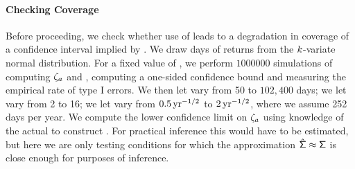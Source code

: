 \documentclass[10pt,a4paper,english]{article}
\theoremstyle{plain}
\theoremstyle{definition}
\newtheorem{example}{Example}[section]
\theoremstyle{remark}
\providecommand{\cono}[1][\typeI]{\mathSUB{c}{#1}}
\begin{document}
\paragraph{Checking Coverage}


Before proceeding, we check whether use of 
leads to a degradation in coverage of a confidence interval implied by .
We draw \ssiz days of returns from the $\nstrat$-variate normal distribution.
For a fixed value of \psnropt, we perform 
$1000000$ simulations of computing $\psnr[a]$ and \ssrsqopt, computing a
one-sided confidence bound and measuring the empirical rate of type I errors.
We then let \ssiz vary from 50 to $102,400$ days; 
we let \nstrat vary from 2 to 16;
we let \psnropt vary from $0.5\,\yrtomhalf$ to $2\,\yrtomhalf$, where we assume
252 days per year. 
We compute the lower confidence limit on $\psnr[a]$ using knowledge of the
actual \psnropt to construct \cono[\typeI].
For practical inference this would
have to be estimated, but here we are only testing conditions for which the 
approximation $\svsig\approx\pvsig$ is close enough for purposes of inference.

%
\end{document}

